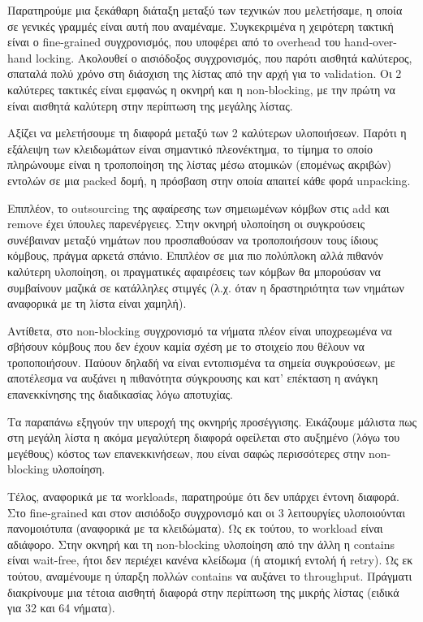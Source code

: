 \documentclass[12pt,titlepage]{article}
\begin{document}
Παρατηρούμε μια ξεκάθαρη διάταξη μεταξύ των τεχνικών που μελετήσαμε, η οποία σε
γενικές γραμμές είναι αυτή που αναμέναμε. Συγκεκριμένα η χειρότερη τακτική είναι
ο fine-grained συγχρονισμός, που υποφέρει από το overhead του hand-over-hand
locking. Ακολουθεί ο αισιόδοξος συγχρονισμός, που παρότι αισθητά καλύτερος,
σπαταλά πολύ χρόνο στη διάσχιση της λίστας από την αρχή για το validation. Οι 2
καλύτερες τακτικές είναι εμφανώς η οκνηρή και η non-blocking, με την πρώτη να
είναι αισθητά καλύτερη στην περίπτωση της μεγάλης λίστας.

Αξίζει να μελετήσουμε τη διαφορά μεταξύ των 2 καλύτερων υλοποιήσεων. Παρότι η
εξάλειψη των κλειδωμάτων είναι σημαντικό πλεονέκτημα, το τίμημα το οποίο
πληρώνουμε είναι η τροποποίηση της λίστας μέσω ατομικών (επομένως ακριβών)
εντολών σε μια packed δομή, η πρόσβαση στην οποία απαιτεί κάθε φορά unpacking.

Επιπλέον, το outsourcing της αφαίρεσης των σημειωμένων κόμβων στις add και
remove έχει ύπουλες παρενέργειες. Στην οκνηρή υλοποίηση οι συγκρούσεις
συνέβαιναν μεταξύ νημάτων που προσπαθούσαν να τροποποιήσουν τους ίδιους κόμβους,
πράγμα αρκετά σπάνιο. Επιπλέον σε μια πιο πολύπλοκη αλλά πιθανόν καλύτερη
υλοποίηση, οι πραγματικές αφαιρέσεις των κόμβων θα μπορούσαν να συμβαίνουν
μαζικά σε κατάλληλες στιμγές (λ.χ. όταν η δραστηριότητα των νημάτων αναφορικά με
τη λίστα είναι χαμηλή).

Αντίθετα, στο non-blocking συγχρονισμό τα νήματα πλέον είναι υποχρεωμένα να
σβήσουν κόμβους που δεν έχουν καμία σχέση με το στοιχείο που θέλουν να
τροποποιήσουν. Παύουν δηλαδή να είναι εντοπισμένα τα σημεία συγκρούσεων, με
αποτέλεσμα να αυξάνει η πιθανότητα σύγκρουσης και κατ' επέκταση η ανάγκη
επανεκκίνησης της διαδικασίας λόγω αποτυχίας.

Τα παραπάνω εξηγούν την υπεροχή της οκνηρής προσέγγισης. Εικάζουμε μάλιστα πως
στη μεγάλη λίστα η ακόμα μεγαλύτερη διαφορά οφείλεται στο αυξημένο (λόγω του
μεγέθους) κόστος των επανεκκινήσεων, που είναι σαφώς περισσότερες στην
non-blocking υλοποίηση.

Τέλος, αναφορικά με τα workloads, παρατηρούμε ότι δεν υπάρχει έντονη διαφορά.
Στο fine-grained και στον αισιόδοξο συγχρονισμό και οι 3 λειτουργίες
υλοποιούνται πανομοιότυπα (αναφορικά με τα κλειδώματα). Ως εκ τούτου, το
workload είναι αδιάφορο. Στην οκνηρή και τη non-blocking υλοποίηση από την άλλη
η contains είναι wait-free, ήτοι δεν περιέχει κανένα κλείδωμα (ή ατομική εντολή
ή retry). Ως εκ τούτου, αναμένουμε η ύπαρξη πολλών contains να αυξάνει το
throughput. Πράγματι διακρίνουμε μια τέτοια αισθητή διαφορά στην περίπτωση της
μικρής λίστας (ειδικά για 32 και 64 νήματα).
\end{document}
